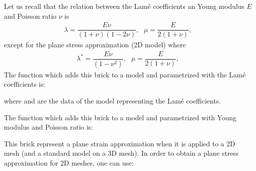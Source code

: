 \documentclass[a4paper,11pt,english]{sphinxmanual}
\begin{document}
Let us recall that the relation between the Lamé coefficients an Young modulus \(E\) and Poisson ratio \(\nu\) is
\begin{equation*}
\begin{split}\lambda = \dfrac{E\nu}{(1+\nu)(1-2\nu)}, ~~~ \mu = \dfrac{E}{2(1+\nu)},\end{split}
\end{equation*}
except for the plane stress approximation (2D model) where
\begin{equation*}
\begin{split}\lambda^* = \dfrac{E\nu}{(1-\nu^2)}, ~~~ \mu = \dfrac{E}{2(1+\nu)},\end{split}
\end{equation*}
The function which adds this brick to a model and parametrized with the Lamé coefficients is:

\begin{sphinxVerbatim}[commandchars=\\\{\}]
  
                
               
\end{sphinxVerbatim}

where  and  are the data of the model
representing the Lamé coefficients.

The function which adds this brick to a model and parametrized with Young modulus and Poisson ratio is:

\begin{sphinxVerbatim}[commandchars=\\\{\}]
  
                   
\end{sphinxVerbatim}

This brick represent a plane strain approximation when it is applied to a 2D mesh (and a standard model on a 3D mesh). In order to obtain a plane stress approximation for 2D meshes, one can use:
\end{document}
